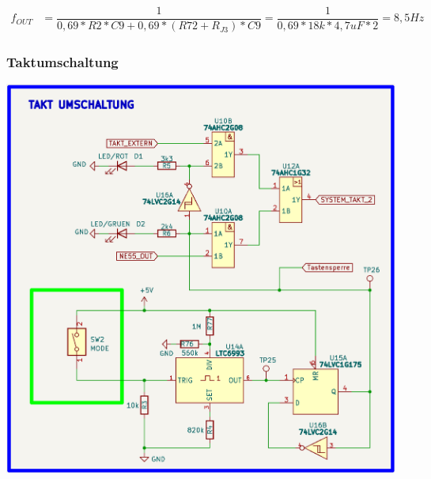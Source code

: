 \begin{center}
\begin{align*}
	f_{OUT} &= \dfrac{1}{0,69*R2*C9 + 0,69*(R72+R_{J3})* C9} = \dfrac{1}{0,69*18k*4,7uF*2} = 8,5Hz
\end{align*} 
\end{center}

\newpage
\subsubsection{Taktumschaltung}

\begin{center}
\includegraphics[width=13cm]{Bilder/Taktumschaltung.png}
\end{center}


